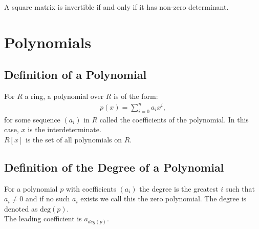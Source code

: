 \documentclass[a4paper, 12pt, twoside]{article}
\begin{document}
A square matrix is invertible if and only if it has non-zero determinant.

\section{Polynomials}

\subsection{Definition of a Polynomial}

For $R$ a ring, a polynomial over $R$ is of the form: \begin{gather*}
  p(x) = \sum_{i = 0}^n a_ix^i,
\end{gather*} for some sequence $(a_i)$ in $R$ called the coefficients
of the polynomial. In this case, $x$ is the interdeterminate.
\\[\baselineskip]
$R[x]$ is the set of all polynomials on $R$. 

\subsection{Definition of the Degree of a Polynomial}

For a polynomial $p$ with coefficients $(a_i)$ the degree is the greatest 
$i$ such that $a_i \neq 0$ and if no such $a_i$ exists we call this 
the zero polynomial. The degree is denoted as $\text{deg}(p)$.
\\[\baselineskip]
The leading coefficient is $a_{deg(p)}$.
\end{document}
